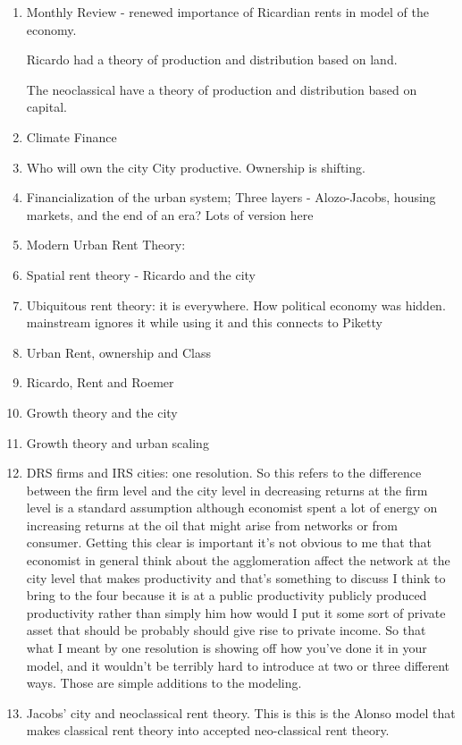 \documentclass[]{article}
\begin{document}
 
\begin{enumerate}
    \item Monthly Review - renewed importance of Ricardian rents in model of the economy.
    
    Ricardo had a theory of production and distribution based on land. 

    The neoclassical have a theory of production and distribution based on capital.


    \item Climate Finance 
    \item Who will own  the city City  productive. Ownership is shifting.
    \item {\color{red!30}Financialization of the urban system; Three layers - Alozo-Jacobs, housing markets, and the end of an era? }
Lots of version here
    \item Modern Urban Rent Theory: 
    \item Spatial rent theory - Ricardo and the city
    \item {\color{red!30} Ubiquitous rent theory: it is everywhere. How political economy was hidden. mainstream ignores it while using it and this connects to Piketty}
    \item Urban Rent, ownership and Class 
    \item Ricardo, Rent and Roemer
    \item Growth theory and the city
    \item Growth theory and urban scaling
    \item DRS firms and IRS cities: one resolution.
So this refers to the difference between the firm level and the city level in decreasing returns at the firm level is a standard assumption although economist spent a lot of energy on increasing returns at the oil that might arise from networks or from consumer. Getting this clear is important it's not obvious to me that that economist in general think about the agglomeration affect the network at the city level that makes productivity and that's something to discuss I think to bring to the four because it is at a public productivity publicly produced productivity rather than simply him how would I put it some sort of private asset that should be probably should give rise to private income. So that what I meant by one resolution is showing off how you've done it in your model, and it wouldn't be terribly hard to introduce at two or three different ways. Those are simple additions to the modeling.
    \item Jacobs' city and neoclassical rent theory. This is this is the Alonso model that makes classical rent theory into accepted neo-classical rent theory.

\end{enumerate}
\end{document}
